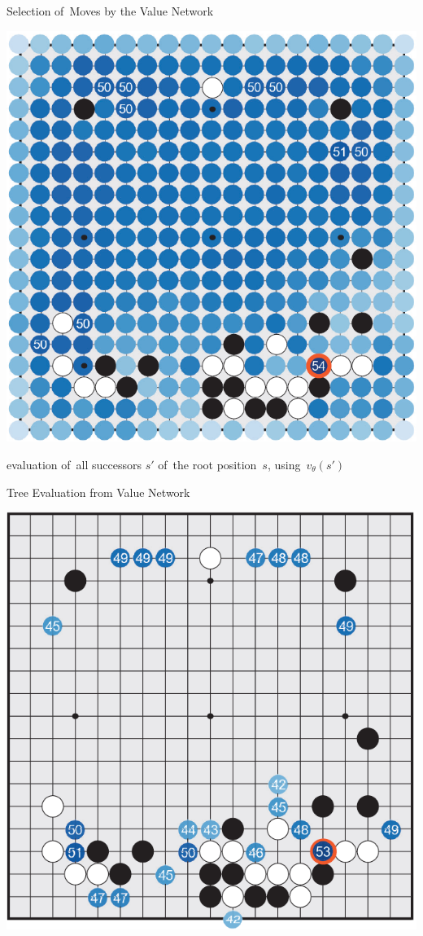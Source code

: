 \documentclass{beamer}
\begin{document}
{    \begin{frame}{Selection of~Moves by the Value Network}
      \begin{center}
        \includegraphics[height=.8\textheight]{../img/move_selection_by_value_network.png}

        \tiny
        evaluation of~all successors $s'$ of~the root position~$s$, using~$v_\theta(s′)$
      \end{center}
    \end{frame}

    \begin{frame}{Tree Evaluation from Value Network}
      \begin{center}
        \includegraphics[height=.82\textheight]{../img/tree_eval_from_value_network.png}


\end{center}
\end{frame}}
\end{document}
